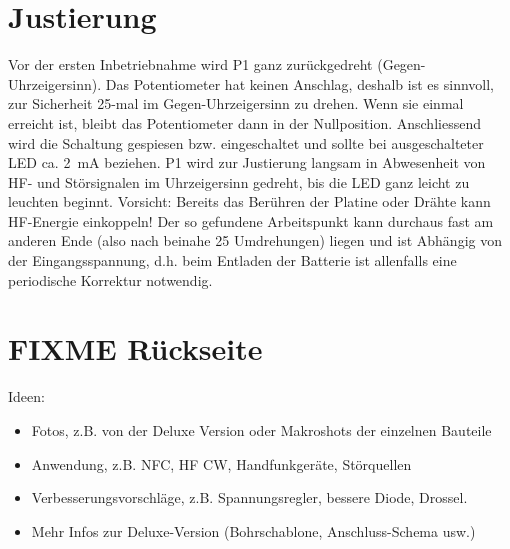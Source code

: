 \documentclass[a4paper,11pt,halfparskip,smallheadings,DIV=10]{scrartcl}
\begin{document}
\section{Justierung}
Vor der ersten Inbetriebnahme wird P1 ganz zurückgedreht (Gegen-Uhrzeigersinn).
Das Potentiometer hat keinen Anschlag, deshalb ist es sinnvoll, zur Sicherheit
25-mal im Gegen-Uhrzeigersinn zu drehen. Wenn sie einmal erreicht ist, bleibt
das Potentiometer dann in der Nullposition. Anschliessend wird die Schaltung gespiesen
bzw. eingeschaltet und sollte bei ausgeschalteter LED ca. 2~mA beziehen. P1
wird zur Justierung langsam in Abwesenheit von HF- und Störsignalen im
Uhrzeigersinn gedreht, bis die LED ganz leicht zu leuchten beginnt. Vorsicht:
Bereits das Berühren der Platine oder Drähte kann HF-Energie einkoppeln!
Der so gefundene Arbeitspunkt kann durchaus fast am anderen Ende (also nach
beinahe 25 Umdrehungen) liegen und ist Abhängig von der Eingangsspannung, d.h. beim
Entladen der Batterie ist allenfalls eine periodische Korrektur notwendig.

\newpage

\section{FIXME Rückseite}

Ideen:

\begin{itemize}
    \item Fotos, z.B. von der Deluxe Version oder Makroshots der einzelnen Bauteile
    \item Anwendung, z.B. NFC, HF CW, Handfunkgeräte, Störquellen
    \item Verbesserungsvorschläge, z.B. Spannungsregler, bessere Diode, Drossel.
    \item Mehr Infos zur Deluxe-Version (Bohrschablone, Anschluss-Schema usw.)
\end{itemize}
\end{document}
